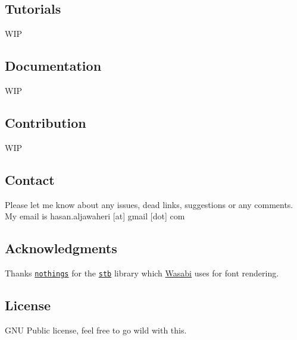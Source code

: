\subsection*{Tutorials}

W\+IP

\subsection*{Documentation}

W\+IP

\subsection*{Contribution}

W\+IP

\subsection*{Contact}

Please let me know about any issues, dead links, suggestions or any comments. My email is hasan.\+aljawaheri \mbox{[}at\mbox{]} gmail \mbox{[}dot\mbox{]} com

\subsection*{Acknowledgments}


\begin{DoxyItemize}
\item Thanks \href{https://github.com/nothings}{\tt nothings} for the \href{https://github.com/nothings/stb}{\tt stb} library which \hyperlink{class_wasabi}{Wasabi} uses for font rendering.
\end{DoxyItemize}

\subsection*{License}

G\+NU Public license, feel free to go wild with this. 